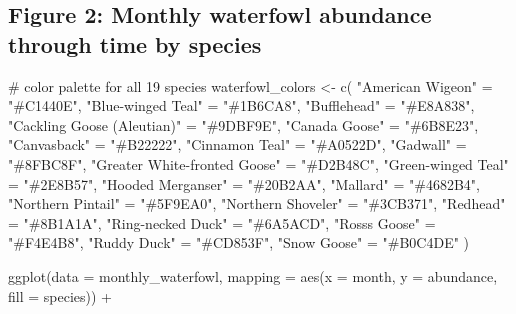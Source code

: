 \documentclass[
  letterpaper,
  DIV=11,
  numbers=noendperiod]{scrartcl}
\newenvironment{Shaded}{\begin{snugshade}}{\end{snugshade}}
\newcommand{\AttributeTok}[1]{\textcolor[rgb]{0.40,0.45,0.13}{#1}}
\newcommand{\CommentTok}[1]{\textcolor[rgb]{0.37,0.37,0.37}{#1}}
\newcommand{\FunctionTok}[1]{\textcolor[rgb]{0.28,0.35,0.67}{#1}}
\newcommand{\NormalTok}[1]{\textcolor[rgb]{0.00,0.23,0.31}{#1}}
\newcommand{\OtherTok}[1]{\textcolor[rgb]{0.00,0.23,0.31}{#1}}
\newcommand{\SpecialCharTok}[1]{\textcolor[rgb]{0.37,0.37,0.37}{#1}}
\newcommand{\StringTok}[1]{\textcolor[rgb]{0.13,0.47,0.30}{#1}}
\begin{document}
\subsection{Figure 2: Monthly waterfowl abundance through time by
species}\label{figure-2-monthly-waterfowl-abundance-through-time-by-species}

\begin{Shaded}
\begin{Highlighting}[]
\CommentTok{\# color palette for all 19 species}
\NormalTok{waterfowl\_colors }\OtherTok{\textless{}{-}} \FunctionTok{c}\NormalTok{(}
  \StringTok{"American Wigeon"}             \OtherTok{=} \StringTok{"\#C1440E"}\NormalTok{,}
  \StringTok{"Blue{-}winged Teal"}            \OtherTok{=} \StringTok{"\#1B6CA8"}\NormalTok{,}
  \StringTok{"Bufflehead"}                  \OtherTok{=} \StringTok{"\#E8A838"}\NormalTok{,}
  \StringTok{"Cackling Goose (Aleutian)"}   \OtherTok{=} \StringTok{"\#9DBF9E"}\NormalTok{,}
  \StringTok{"Canada Goose"}                \OtherTok{=} \StringTok{"\#6B8E23"}\NormalTok{,}
  \StringTok{"Canvasback"}                  \OtherTok{=} \StringTok{"\#B22222"}\NormalTok{,}
  \StringTok{"Cinnamon Teal"}               \OtherTok{=} \StringTok{"\#A0522D"}\NormalTok{,}
  \StringTok{"Gadwall"}                     \OtherTok{=} \StringTok{"\#8FBC8F"}\NormalTok{,}
  \StringTok{"Greater White{-}fronted Goose"} \OtherTok{=} \StringTok{"\#D2B48C"}\NormalTok{,}
  \StringTok{"Green{-}winged Teal"}           \OtherTok{=} \StringTok{"\#2E8B57"}\NormalTok{,}
  \StringTok{"Hooded Merganser"}            \OtherTok{=} \StringTok{"\#20B2AA"}\NormalTok{,}
  \StringTok{"Mallard"}                     \OtherTok{=} \StringTok{"\#4682B4"}\NormalTok{,}
  \StringTok{"Northern Pintail"}            \OtherTok{=} \StringTok{"\#5F9EA0"}\NormalTok{,}
  \StringTok{"Northern Shoveler"}           \OtherTok{=} \StringTok{"\#3CB371"}\NormalTok{,}
  \StringTok{"Redhead"}                     \OtherTok{=} \StringTok{"\#8B1A1A"}\NormalTok{,}
  \StringTok{"Ring{-}necked Duck"}            \OtherTok{=} \StringTok{"\#6A5ACD"}\NormalTok{,}
  \StringTok{"Ross\textquotesingle{}s Goose"}                \OtherTok{=} \StringTok{"\#F4E4B8"}\NormalTok{,}
  \StringTok{"Ruddy Duck"}                  \OtherTok{=} \StringTok{"\#CD853F"}\NormalTok{,}
  \StringTok{"Snow Goose"}                  \OtherTok{=} \StringTok{"\#B0C4DE"}
\NormalTok{)}

\FunctionTok{ggplot}\NormalTok{(}\AttributeTok{data =}\NormalTok{ monthly\_waterfowl,}
       \AttributeTok{mapping =} \FunctionTok{aes}\NormalTok{(}\AttributeTok{x =}\NormalTok{ month,}
                     \AttributeTok{y =}\NormalTok{ abundance,}
                     \AttributeTok{fill =}\NormalTok{ species)) }\SpecialCharTok{+}


\end{Highlighting}
\end{Shaded}
\end{document}
